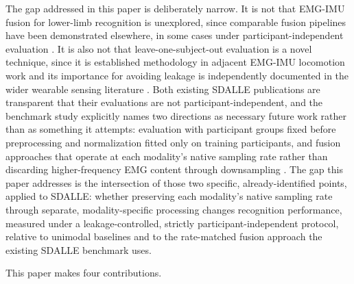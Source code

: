 \documentclass[conference]{IEEEtran}
\begin{document}
The gap addressed in this paper is deliberately narrow. It is not
that EMG-IMU fusion for lower-limb recognition is unexplored, since
comparable fusion pipelines have been demonstrated elsewhere, in some
cases under participant-independent evaluation
\cite{ruhrbergestevez2025ankleexo, xu2026dsaf}. It is also not that
leave-one-subject-out evaluation is a novel technique, since it is
established methodology in adjacent EMG-IMU locomotion work
\cite{xu2026dsaf} and its importance for avoiding leakage is
independently documented in the wider wearable sensing literature
\cite{rehman2024validation, cai2025generalizablehar}. Both existing
SDALLE publications are transparent that their evaluations are not
participant-independent, and the benchmark study explicitly names
two directions as necessary future work rather than as something it
attempts: evaluation with participant groups fixed before
preprocessing and normalization fitted only on training
participants, and fusion approaches that operate at each modality's
native sampling rate rather than discarding higher-frequency EMG
content through downsampling \cite{farouk2026sdalle}. The gap this
paper addresses is the intersection of those two specific,
already-identified points, applied to SDALLE: whether preserving
each modality's native sampling rate through separate,
modality-specific processing changes recognition performance,
measured under a leakage-controlled, strictly participant-independent
protocol, relative to unimodal baselines and to the rate-matched
fusion approach the existing SDALLE benchmark uses.

This paper makes four contributions.
\end{document}
